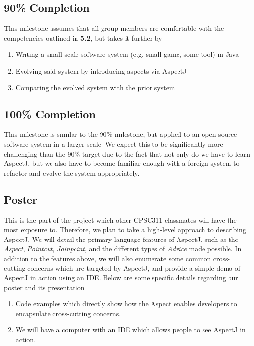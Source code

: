 \documentclass[sigconf]{acmart}
\begin{document}
\subsection{90\% Completion}
This milestone assumes that all group members are comfortable with the competencies outlined in \textbf{5.2}, but takes it further by
\begin{enumerate}
    \item Writing a small-scale software system (e.g. small game, some tool) in Java
    \item Evolving said system by introducing aspects via AspectJ
    \item Comparing the evolved system with the prior system
\end{enumerate}

\subsection{100\% Completion}
This milestone is similar to the 90\% milestone, but applied to an open-source software system in a larger scale. We expect this to be significantly more challenging than the 90\% target due to the fact that not only do we have to learn AspectJ, but we also have to become familiar enough with a foreign system to refactor and evolve the system appropriately.

\subsection{Poster}
This is the part of the project which other CPSC311 classmates will have the most exposure to. Therefore, we plan to take a high-level approach to describing AspectJ. We will detail the primary language features of AspectJ, such as the \textit{Aspect}, \textit{Pointcut}, \textit{Joinpoint}, and the different types of \textit{Advice} made possible. In addition to the features above, we will also enumerate some common cross-cutting concerns which are targeted by AspectJ, and provide a simple demo of AspectJ in action using an IDE. Below are some specific details regarding our poster and its presentation
\begin{enumerate}
    \item Code examples which directly show how the Aspect enables developers to encapsulate cross-cutting concerns.
    \item We will have a computer with an IDE which allows people to see AspectJ in action.
\end{enumerate}
\end{document}
